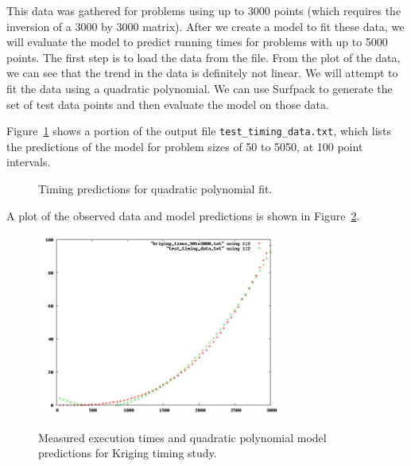 \documentclass{article}
\begin{document}
This data was gathered for problems using up to 3000 points (which requires the
inversion of a 3000 by 3000 matrix).  After we create a model to fit these data,
we will evaluate the model to predict running times for problems with up to 5000
points.  The first step is to load the data from the file.
From the plot of the data, we can see that the trend in the data is definitely
not linear.  We will attempt to fit the data using a quadratic polynomial.
We can use Surfpack to generate the set of test data points and then evaluate
the model on those data.


Figure~\ref{fig:test_data_extract} shows a portion of the output file \texttt{test\_timing\_data.txt}, which
lists the predictions of the model for problem sizes of 50 to 5050, at 100 point
intervals.
\begin{figure}[htbp]
  \centering
  \begin{bigbox}
	\begin{small}
 	\end{small}
  \end{bigbox}
  \label{fig:test_data_extract}
  \caption{Timing predictions for quadratic polynomial fit.}
\end{figure}
A plot of the observed data and model predictions is shown in Figure~\ref{fig:timing_poly2}.

\begin{figure}[htbp]
  \centering 
  \includegraphics[width=8cm]{TimingMatrixOp/timing_poly2.png}
  \label{fig:timing_poly2}
  \caption{ Measured execution times and quadratic polynomial model predictions for Kriging timing study.}
\end{figure}
\end{document}
